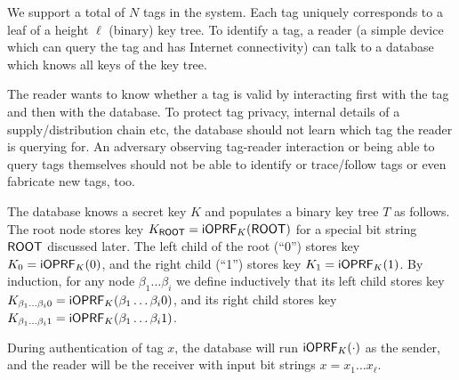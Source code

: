 \documentclass{article}
\begin{document}
We support a total of $N$ tags in the system. Each tag uniquely
corresponds to a leaf of a height $\ell$ (binary) key tree. To
identify a tag, a reader (a simple device which can query the tag and
has Internet connectivity) can talk to a database which knows all keys
of the key tree.

The reader wants to know whether a tag is valid by interacting first
with the tag and then with the database. To protect tag privacy,
internal details of a supply/distribution chain etc, the database
should not learn which tag the reader is querying for. An adversary
observing tag-reader interaction or being able to query tags
themselves should not be able to identify or trace/follow tags or
even fabricate new tags, too.


The database knows a secret key $K$ and populates a binary key tree
$T$ as follows.  The root node stores key
$K_{\mathsf{ROOT}}=\mathsf{i}\mathsf{OPRF}_K(\mathsf{ROOT})$ for a special bit string $\mathsf{ROOT}$
discussed later.  The left child of the root (``0'') stores key
$K_0=\mathsf{i}\mathsf{OPRF}_K(0)$, and the right child (``1'') stores key
$K_1=\mathsf{i}\mathsf{OPRF}_K(1)$. By induction, for any node $\beta_1\ldots\beta_i$
we define inductively that its left child stores key
$K_{\beta_1\ldots\beta_i0}=\mathsf{i}\mathsf{OPRF}_K(\beta_1\ldots\beta_i0)$, and its
right child stores key
$K_{\beta_1\ldots\beta_i1}=\mathsf{i}\mathsf{OPRF}_K(\beta_1\ldots\beta_i1)$.

During authentication of tag $x$, the database will run
$\mathsf{i}\mathsf{OPRF}_K(\cdot)$ as the sender, and the reader will be the receiver
with input bit strings $x=x_1\ldots{}x_\ell$.
\end{document}
